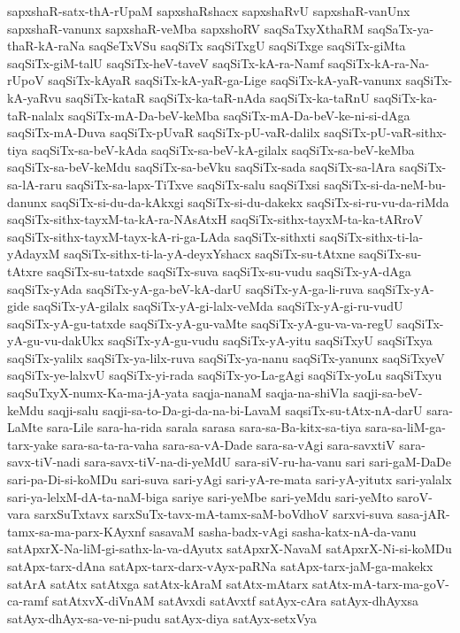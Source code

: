 {sapxshaR-satx-thA-rUpaM
sapxshaRshacx
sapxshaRvU
sapxshaR-vanUnx
sapxshaR-vanunx
sapxshaR-veMba
sapxshoRV
saqSaTxyXthaRM
saqSaTx-ya-thaR-kA-raNa
saqSeTxVSu
saqSiTx
saqSiTxgU
saqSiTxge
saqSiTx-giMta
saqSiTx-giM-talU
saqSiTx-heV-taveV
saqSiTx-kA-ra-Namf
saqSiTx-kA-ra-Na-rUpoV
saqSiTx-kAyaR
saqSiTx-kA-yaR-ga-Lige
saqSiTx-kA-yaR-vanunx
saqSiTx-kA-yaRvu
saqSiTx-kataR
saqSiTx-ka-taR-nAda
saqSiTx-ka-taRnU
saqSiTx-ka-taR-nalalx
saqSiTx-mA-Da-beV-keMba
saqSiTx-mA-Da-beV-ke-ni-si-dAga
saqSiTx-mA-Duva
saqSiTx-pUvaR
saqSiTx-pU-vaR-dalilx
saqSiTx-pU-vaR-sithx-tiya
saqSiTx-sa-beV-kAda
saqSiTx-sa-beV-kA-gilalx
saqSiTx-sa-beV-keMba
saqSiTx-sa-beV-keMdu
saqSiTx-sa-beVku
saqSiTx-sada
saqSiTx-sa-lAra
saqSiTx-sa-lA-raru
saqSiTx-sa-lapx-TiTxve
saqSiTx-salu
saqSiTxsi
saqSiTx-si-da-neM-bu-danunx
saqSiTx-si-du-da-kAkxgi
saqSiTx-si-du-dakekx
saqSiTx-si-ru-vu-da-riMda
saqSiTx-sithx-tayxM-ta-kA-ra-NAsAtxH
saqSiTx-sithx-tayxM-ta-ka-tARroV
saqSiTx-sithx-tayxM-tayx-kA-ri-ga-LAda
saqSiTx-sithxti
saqSiTx-sithx-ti-la-yAdayxM
saqSiTx-sithx-ti-la-yA-deyxYshacx
saqSiTx-su-tAtxne
saqSiTx-su-tAtxre
saqSiTx-su-tatxde
saqSiTx-suva
saqSiTx-su-vudu
saqSiTx-yA-dAga
saqSiTx-yAda
saqSiTx-yA-ga-beV-kA-darU
saqSiTx-yA-ga-li-ruva
saqSiTx-yA-gide
saqSiTx-yA-gilalx
saqSiTx-yA-gi-lalx-veMda
saqSiTx-yA-gi-ru-vudU
saqSiTx-yA-gu-tatxde
saqSiTx-yA-gu-vaMte
saqSiTx-yA-gu-va-va-regU
saqSiTx-yA-gu-vu-dakUkx
saqSiTx-yA-gu-vudu
saqSiTx-yA-yitu
saqSiTxyU
saqSiTxya
saqSiTx-yalilx
saqSiTx-ya-lilx-ruva
saqSiTx-ya-nanu
saqSiTx-yanunx
saqSiTxyeV
saqSiTx-ye-lalxvU
saqSiTx-yi-rada
saqSiTx-yo-La-gAgi
saqSiTx-yoLu
saqSiTxyu
saqSuTxyX-numx-Ka-ma-jA-yata
saqja-nanaM
saqja-na-shiVla
saqji-sa-beV-keMdu
saqji-salu
saqji-sa-to-Da-gi-da-na-bi-LavaM
saqsiTx-su-tAtx-nA-darU
sara-LaMte
sara-Lile
sara-ha-rida
sarala
sarasa
sara-sa-Ba-kitx-sa-tiya
sara-sa-liM-ga-tarx-yake
sara-sa-ta-ra-vaha
sara-sa-vA-Dade
sara-sa-vAgi
sara-savxtiV
sara-savx-tiV-nadi
sara-savx-tiV-na-di-yeMdU
sara-siV-ru-ha-vanu
sari
sari-gaM-DaDe
sari-pa-Di-si-koMDu
sari-suva
sari-yAgi
sari-yA-re-mata
sari-yA-yitutx
sari-yalalx
sari-ya-lelxM-dA-ta-naM-biga
sariye
sari-yeMbe
sari-yeMdu
sari-yeMto
saroV-vara
sarxSuTxtavx
sarxSuTx-tavx-mA-tamx-saM-boVdhoV
sarxvi-suva
sasa-jAR-tamx-sa-ma-parx-KAyxnf
sasavaM
sasha-badx-vAgi
sasha-katx-nA-da-vanu
satApxrX-Na-liM-gi-sathx-la-va-dAyutx
satApxrX-NavaM
satApxrX-Ni-si-koMDu
satApx-tarx-dAna
satApx-tarx-darx-vAyx-paRNa
satApx-tarx-jaM-ga-makekx
satArA
satAtx
satAtxga
satAtx-kAraM
satAtx-mAtarx
satAtx-mA-tarx-ma-goV-ca-ramf
satAtxvX-diVnAM
satAvxdi
satAvxtf
satAyx-cAra
satAyx-dhAyxsa
satAyx-dhAyx-sa-ve-ni-pudu
satAyx-diya
satAyx-setxVya
}
